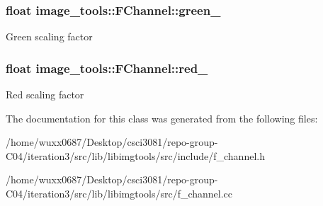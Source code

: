 \subsubsection[{\texorpdfstring{green\+\_\+}{green_}}]{\setlength{\rightskip}{0pt plus 5cm}float image\+\_\+tools\+::\+F\+Channel\+::green\+\_\+\hspace{0.3cm}{\ttfamily [private]}}\hypertarget{classimage__tools_1_1FChannel_a42ef11eef9bfad14df5007959047ccc6}{}\label{classimage__tools_1_1FChannel_a42ef11eef9bfad14df5007959047ccc6}
Green scaling factor 
\subsubsection[{\texorpdfstring{red\+\_\+}{red_}}]{\setlength{\rightskip}{0pt plus 5cm}float image\+\_\+tools\+::\+F\+Channel\+::red\+\_\+\hspace{0.3cm}{\ttfamily [private]}}\hypertarget{classimage__tools_1_1FChannel_a6d2b5a5e5bffb3673df6191cf642f337}{}\label{classimage__tools_1_1FChannel_a6d2b5a5e5bffb3673df6191cf642f337}
Red scaling factor 

The documentation for this class was generated from the following files\+:\begin{DoxyCompactItemize}
\item 
/home/wuxx0687/\+Desktop/csci3081/repo-\/group-\/\+C04/iteration3/src/lib/libimgtools/src/include/f\+\_\+channel.\+h\item 
/home/wuxx0687/\+Desktop/csci3081/repo-\/group-\/\+C04/iteration3/src/lib/libimgtools/src/f\+\_\+channel.\+cc\end{DoxyCompactItemize}
